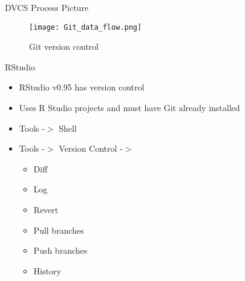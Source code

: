 \begin{frame}[t,fragile]{DVCS Process Picture}
\begin{figure}
\texttt{[image: Git\_data\_flow.png]} 
\caption{Git version control}
\end{figure}
\end{frame}

\begin{frame}[t,fragile]{RStudio}
\begin{itemize}
\item RStudio v0.95 has version control
\item Uses R Studio projects and must have Git already installed
\item Tools -$>$ Shell
\item Tools -$>$ Version Control -$>$
	\begin{itemize}
	\item Diff
	\item Log
	\item Revert
	\item Pull branches
	\item Push branches
	\item History
	\end{itemize}
\end{itemize}
\end{frame}





